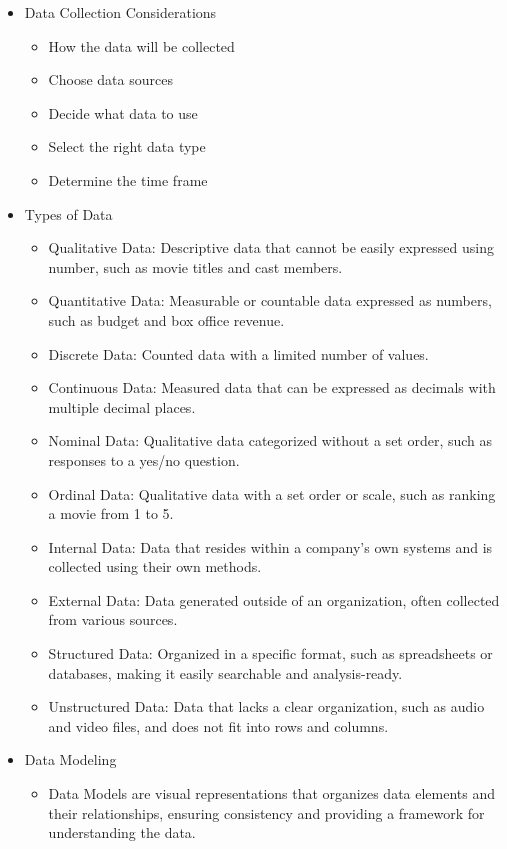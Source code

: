 \documentclass[a4paper]{article}
\begin{document}
\begin{itemize}
        \item Data Collection Considerations
            \begin{itemize}
                \item How the data will be collected
                \item Choose data sources
                \item Decide what data to use
                \item Select the right data type
                \item Determine the time frame 
            \end{itemize}

        \item Types of Data
            \begin{itemize}
                \item Qualitative Data: Descriptive data that cannot be easily expressed using number, such as movie titles and cast members.
                \item Quantitative Data: Measurable or countable data expressed as numbers, such as budget and box office revenue.
                \item Discrete Data: Counted data with a limited number of values.
                \item Continuous Data: Measured data that can be expressed as decimals with multiple decimal places.
                \item Nominal Data: Qualitative data categorized without a set order, such as responses to a yes/no question.
                \item Ordinal Data: Qualitative data with a set order or scale, such as ranking a movie from 1 to 5.
                \item Internal Data: Data that resides within a company's own systems and is collected using their own methods.
                \item External Data: Data generated outside of an organization, often collected from various sources.
                \item Structured Data: Organized in a specific format, such as spreadsheets or databases, making it easily searchable and analysis-ready.
                \item Unstructured Data: Data that lacks a clear organization, such as audio and video files, and does not fit into rows and columns.
            \end{itemize}
        \item Data Modeling 
            \begin{itemize}
                \item Data Models are visual representations that organizes data elements and their relationships, ensuring consistency and providing a framework for understanding the data.
            \end{itemize}


\end{itemize}
\end{document}
